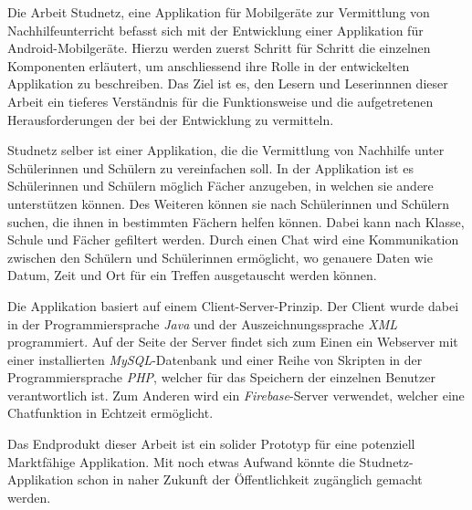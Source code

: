 \documentclass[../main.tex]{subfiles}
\begin{document}
	
	Die Arbeit \glqq Studnetz, eine Applikation für Mobilgeräte zur Vermittlung von Nachhilfeunterricht\grqq{} befasst sich mit der Entwicklung einer Applikation für Android-Mobilgeräte. Hierzu werden zuerst Schritt für Schritt die einzelnen Komponenten erläutert, um anschliessend ihre Rolle in der entwickelten Applikation zu beschreiben. Das Ziel ist es, den Lesern und Leserinnnen dieser Arbeit ein tieferes Verständnis für die Funktionsweise und die aufgetretenen Herausforderungen der bei der Entwicklung zu vermitteln.
	
	Studnetz selber ist einer Applikation, die die Vermittlung von Nachhilfe unter Schülerinnen und Schülern zu vereinfachen soll. In der Applikation ist es Schülerinnen und Schülern möglich Fächer anzugeben, in welchen sie andere unterstützen können. Des Weiteren können sie nach Schülerinnen und Schülern suchen, die ihnen in bestimmten Fächern helfen können. Dabei kann nach Klasse, Schule und Fächer gefiltert werden. Durch einen Chat wird eine Kommunikation zwischen den Schülern und Schülerinnen ermöglicht, wo genauere Daten wie Datum, Zeit und Ort für ein Treffen ausgetauscht werden können.
	
	Die Applikation basiert auf einem Client-Server-Prinzip. Der Client wurde dabei in der Programmiersprache \emph{Java} und der Auszeichnungssprache \emph{XML} programmiert. Auf der Seite der Server findet sich zum Einen ein Webserver mit einer installierten \emph{MySQL}-Datenbank und einer Reihe von Skripten in der Programmiersprache \emph{PHP}, welcher für das Speichern der einzelnen Benutzer verantwortlich ist. Zum Anderen wird ein \emph{Firebase}-Server verwendet, welcher eine Chatfunktion in Echtzeit ermöglicht.
	
	Das Endprodukt dieser Arbeit ist ein solider Prototyp für eine potenziell Marktfähige Applikation. Mit noch etwas Aufwand könnte die Studnetz-Applikation schon in naher Zukunft der Öffentlichkeit zugänglich gemacht werden.
	
\end{document}
